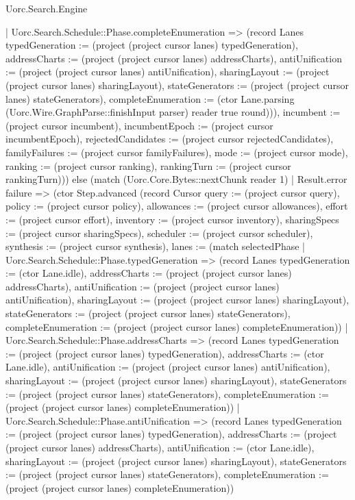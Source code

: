 \begin{lexlean}{Uorc.Search.Engine}
\begin{semanticmodule}
{{        | Uorc.Search.Schedule::Phase.completeEnumeration => (record Lanes {typedGeneration := (project (project cursor lanes) typedGeneration), addressCharts := (project (project cursor lanes) addressCharts), antiUnification := (project (project cursor lanes) antiUnification), sharingLayout := (project (project cursor lanes) sharingLayout), stateGenerators := (project (project cursor lanes) stateGenerators), completeEnumeration := (ctor Lane.parsing (Uorc.Wire.GraphParse::finishInput parser) reader true round)})), incumbent := (project cursor incumbent), incumbentEpoch := (project cursor incumbentEpoch), rejectedCandidates := (project cursor rejectedCandidates), familyFailures := (project cursor familyFailures), mode := (project cursor mode), ranking := (project cursor ranking), rankingTurn := (project cursor rankingTurn)})) else (match (Uorc.Core.Bytes::nextChunk reader 1)
        | Result.error failure => (ctor Step.advanced (record Cursor {query := (project cursor query), policy := (project cursor policy), allowances := (project cursor allowances), effort := (project cursor effort), inventory := (project cursor inventory), sharingSpecs := (project cursor sharingSpecs), scheduler := (project cursor scheduler), synthesis := (project cursor synthesis), lanes := (match selectedPhase
          | Uorc.Search.Schedule::Phase.typedGeneration => (record Lanes {typedGeneration := (ctor Lane.idle), addressCharts := (project (project cursor lanes) addressCharts), antiUnification := (project (project cursor lanes) antiUnification), sharingLayout := (project (project cursor lanes) sharingLayout), stateGenerators := (project (project cursor lanes) stateGenerators), completeEnumeration := (project (project cursor lanes) completeEnumeration)})
          | Uorc.Search.Schedule::Phase.addressCharts => (record Lanes {typedGeneration := (project (project cursor lanes) typedGeneration), addressCharts := (ctor Lane.idle), antiUnification := (project (project cursor lanes) antiUnification), sharingLayout := (project (project cursor lanes) sharingLayout), stateGenerators := (project (project cursor lanes) stateGenerators), completeEnumeration := (project (project cursor lanes) completeEnumeration)})
          | Uorc.Search.Schedule::Phase.antiUnification => (record Lanes {typedGeneration := (project (project cursor lanes) typedGeneration), addressCharts := (project (project cursor lanes) addressCharts), antiUnification := (ctor Lane.idle), sharingLayout := (project (project cursor lanes) sharingLayout), stateGenerators := (project (project cursor lanes) stateGenerators), completeEnumeration := (project (project cursor lanes) completeEnumeration)})
}}
\end{semanticmodule}
\end{lexlean}
